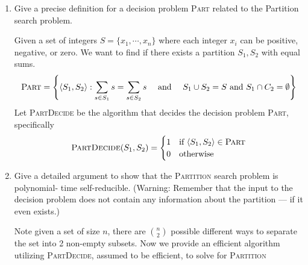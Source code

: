 \documentclass[11pt]{article}
\begin{document}
\begin{enumerate}
    \item  Give a precise definition for a decision problem \textsc{Part} related to the Partition search problem.
    \begin{solution}
        Given a set of integers $S = \{ x_1, \cdots, x_n \}$ where each integer $x_i$ can be positive, negative, or zero. We want to find if there exists a partition $S_1,S_2$ with equal sums. 
        \[
            \textsc{Part} = \left\{ \langle S_1, S_2 \rangle : \sum_{s\in S_1} s = \sum_{s\in S_2} s \quad \text{ and } \quad S_1\cup S_2 = S \text{ and } S_1 \cap C_2 = \emptyset \right\}
        \]
        Let \textsc{PartDecide} be the algorithm that decides the decision problem \textsc{Part}, specifically 
        \[
            \textsc{PartDecide}(S_1, S_2)=
            \begin{cases}
                1 & \text{if } \langle S_1, S_2 \rangle \in \textsc{Part}\\
                0 & \text{otherwise}\\
            \end{cases}
        \] 
    \end{solution}
    \item Give a detailed argument to show that the \textsc{Partition} search problem is polynomial- time self-reducible. (Warning: Remember that the input to the decision problem does not contain any information about the partition — if it even exists.)
    \begin{solution}
        Note given a set of size $n$, there are $\binom{n}{2}$ possible different ways to separate the set into 2 non-empty subsets. Now we provide an efficient algorithm utilizing \textsc{PartDecide}, assumed to be efficient, to solve for \textsc{Partition} \\ 
        \begin{algorithm}[H]
\end{algorithm}
\end{solution}
\end{enumerate}
\end{document}
